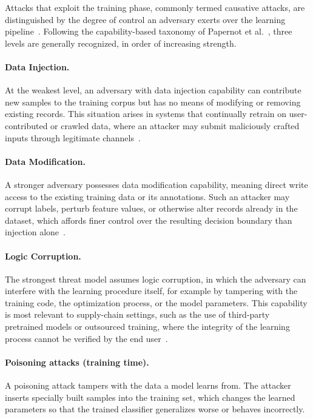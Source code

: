 \documentclass[12pt]{article}
\begin{document}
Attacks that exploit the training phase, commonly termed causative attacks, are distinguished by the degree of control an adversary exerts over the learning pipeline~\cite{barreno2006,huang2011}. Following the capability-based taxonomy of Papernot et al.~\cite{papernot2018sok}, three levels are generally recognized, in order of increasing strength.

\paragraph{Data Injection.} At the weakest level, an adversary with data injection capability can contribute new samples to the training corpus but has no means of modifying or removing existing records. This situation arises in systems that continually retrain on user-contributed or crawled data, where an attacker may submit maliciously crafted inputs through legitimate channels~\cite{biggio2018}.

\paragraph{Data Modification.} A stronger adversary possesses data modification capability, meaning direct write access to the existing training data or its annotations. Such an attacker may corrupt labels, perturb feature values, or otherwise alter records already in the dataset, which affords finer control over the resulting decision boundary than injection alone~\cite{biggio2012,xiao2015}.

\paragraph{Logic Corruption.} The strongest threat model assumes logic corruption, in which the adversary can interfere with the learning procedure itself, for example by tampering with the training code, the optimization process, or the model parameters. This capability is most relevant to supply-chain settings, such as the use of third-party pretrained models or outsourced training, where the integrity of the learning process cannot be verified by the end user~\cite{papernot2018sok,gu2017}.

\paragraph{Poisoning attacks (training time).} A poisoning attack tampers with the data a model learns from. The attacker inserts specially built samples into the training set, which changes the learned parameters so that the trained classifier generalizes worse or behaves incorrectly.
\end{document}
